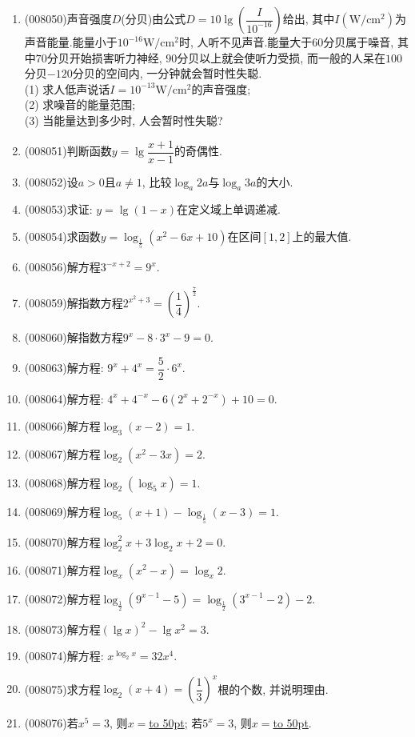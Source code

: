 \documentclass[10pt,a4paper]{article}
\newcommand{\blank}[1]{\underline{\hbox to #1pt{}}}
\begin{document}
\begin{enumerate}[1.]
\item {\tiny (008050)}声音强度$D$(分贝)由公式$D=10\lg (\dfrac I{10^{-16}})$给出, 其中$I(\text{W}/\text{cm}^2)$为声音能量.能量小于$10^{-16}\text{W}/\text{cm}^2$时, 人听不见声音.能量大于$60$分贝属于噪音, 其中$70$分贝开始损害听力神经, $90$分贝以上就会使听力受损, 而一般的人呆在$100$分贝$-120$分贝的空间内, 一分钟就会暂时性失聪.\\
(1) 求人低声说话$I=10^{-13}\text{W}/\text{cm}^2$的声音强度;\\
(2) 求噪音的能量范围;\\
(3) 当能量达到多少时, 人会暂时性失聪?
\item {\tiny (008051)}判断函数$y=\lg\dfrac{x+1}{x-1}$的奇偶性.
\item {\tiny (008052)}设$a>0$且$a\ne 1$, 比较$\log _a2a$与$\log _a3a$的大小.
\item {\tiny (008053)}求证: $y=\lg(1-x)$在定义域上单调递减.
\item {\tiny (008054)}求函数$y=\log _{\frac 15}(x^2-6x+10)$在区间$[1,2]$上的最大值.
\item {\tiny (008056)}解方程$3^{-x+2}=9^x$.
\item {\tiny (008059)}解指数方程$2^{x^2+3}=(\dfrac 14)^{\frac 72}$.
\item {\tiny (008060)}解指数方程$9^x-8\cdot 3^x-9=0$.
\item {\tiny (008063)}解方程: $9^x+4^x=\dfrac 52\cdot 6^x$.
\item {\tiny (008064)}解方程: $4^x+4^{-x}-6(2^x+2^{-x})+10=0$.
\item {\tiny (008066)}解方程$\log _3(x-2)=1$.
\item {\tiny (008067)}解方程$\log _2(x^2-3x)=2$.
\item {\tiny (008068)}解方程$\log _2(\log _5x)=1$.
\item {\tiny (008069)}解方程$\log _5(x+1)-\log _{\frac 15}(x-3)=1$.
\item {\tiny (008070)}解方程$\log _2^2x+3\log _2x+2=0$.
\item {\tiny (008071)}解方程$\log _x(x^2-x)=\log _x2$.
\item {\tiny (008072)}解方程$\log _{\frac 12}(9^{x-1}-5)=\log _{\frac 12}(3^{x-1}-2)-2$.
\item {\tiny (008073)}解方程$(\lg x)^2-\lg x^2=3$.
\item {\tiny (008074)}解方程: $x^{\log _2x}=32x^4$.
\item {\tiny (008075)}求方程$\log _2(x+4)=(\dfrac 13)^x$根的个数, 并说明理由.
\item {\tiny (008076)}若$x^5=3$, 则$x=$\blank{50}; 若$5^x=3$, 则$x=$\blank{50}.

\end{enumerate}
\end{document}
